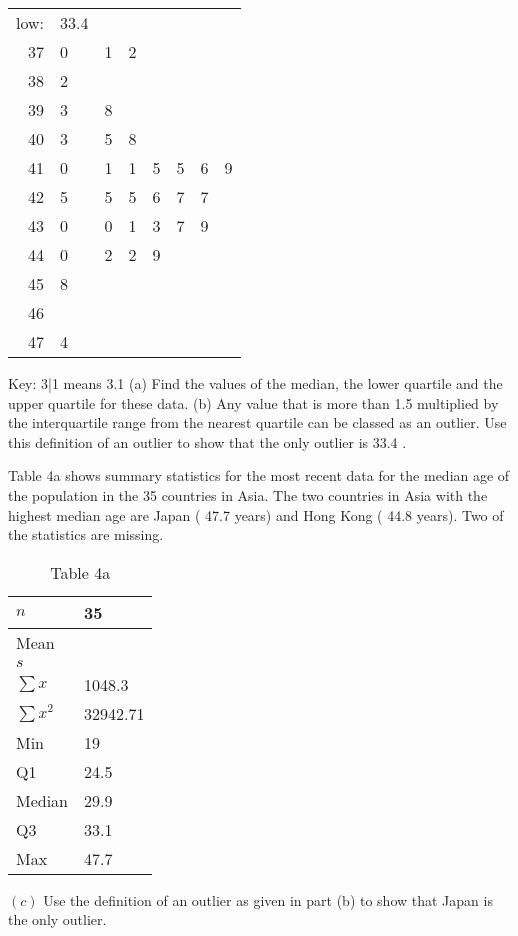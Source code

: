 \begin{tabular}{r|lllllll} 
low: & 33.4 & & & & & \\
37 & 0 & 1 & 2 & & & & \\
38 & 2 & & & & & & \\
39 & 3 & 8 & & & & & \\
40 & 3 & 5 & 8 & & & & \\
41 & 0 & 1 & 1 & 5 & 5 & 6 & 9 \\
42 & 5 & 5 & 5 & 6 & 7 & 7 & \\
43 & 0 & 0 & 1 & 3 & 7 & 9 & \\
44 & 0 & 2 & 2 & 9 & & & \\
45 & 8 & & & & & & \\
46 & & & & & & & \\
47 & 4 & & & & & &
\end{tabular}

Key: 3|1 means 3.1
(a) Find the values of the median, the lower quartile and the upper quartile for these data.
(b) Any value that is more than 1.5 multiplied by the interquartile range from the nearest quartile can be classed as an outlier. Use this definition of an outlier to show that the only outlier is 33.4 .

Table 4a shows summary statistics for the most recent data for the median age of the population in the 35 countries in Asia. The two countries in Asia with the highest median age are Japan ( 47.7 years) and Hong Kong ( 44.8 years). Two of the statistics are missing.

\begin{table}
\begin{tabular}{|l|l|}
\hline$n$ & 35 \\
\hline Mean & \\
\hline$s$ & \\
\hline$\sum x$ & 1048.3 \\
\hline$\sum x^{2}$ & 32942.71 \\
\hline Min & 19 \\
\hline Q1 & 24.5 \\
\hline Median & 29.9 \\
\hline Q3 & 33.1 \\
\hline Max & 47.7 \\
\hline
\end{tabular}
\captionsetup{labelformat=empty}
\caption{Table 4a}
\end{table}
\((c)\) Use the definition of an outlier as given in part (b) to show that Japan is the only outlier.

